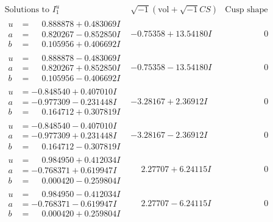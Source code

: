 \documentclass[1p]{elsarticle_modified}
\theoremstyle{definition}
\newcommand{\I}{\sqrt{-1}}
\begin{document}
$$\begin{array}{c|c|c}  
\text{Solutions to }I^u_{1}& \I (\text{vol} + \sqrt{-1}CS) & \text{Cusp shape}\\
 \hline 
\begin{aligned}
u &= \phantom{-}0.888878 + 0.483069 I \\
a &= \phantom{-}0.820267 - 0.852850 I \\
b &= \phantom{-}0.105956 + 0.406692 I\end{aligned}
 & -0.75358 + 13.54180 I & \phantom{-0.000000 } 0 \\ \hline\begin{aligned}
u &= \phantom{-}0.888878 - 0.483069 I \\
a &= \phantom{-}0.820267 + 0.852850 I \\
b &= \phantom{-}0.105956 - 0.406692 I\end{aligned}
 & -0.75358 - 13.54180 I & \phantom{-0.000000 } 0 \\ \hline\begin{aligned}
u &= -0.848540 + 0.407010 I \\
a &= -0.977309 - 0.231448 I \\
b &= \phantom{-}0.164712 + 0.307819 I\end{aligned}
 & -3.28167 + 2.36912 I & \phantom{-0.000000 } 0 \\ \hline\begin{aligned}
u &= -0.848540 - 0.407010 I \\
a &= -0.977309 + 0.231448 I \\
b &= \phantom{-}0.164712 - 0.307819 I\end{aligned}
 & -3.28167 - 2.36912 I & \phantom{-0.000000 } 0 \\ \hline\begin{aligned}
u &= \phantom{-}0.984950 + 0.412034 I \\
a &= -0.768371 + 0.619947 I \\
b &= \phantom{-}0.000420 - 0.259804 I\end{aligned}
 & \phantom{-}2.27707 + 6.24115 I & \phantom{-0.000000 } 0 \\ \hline\begin{aligned}
u &= \phantom{-}0.984950 - 0.412034 I \\
a &= -0.768371 - 0.619947 I \\
b &= \phantom{-}0.000420 + 0.259804 I\end{aligned}
 & \phantom{-}2.27707 - 6.24115 I & \phantom{-0.000000 } 0 \\ \hline\begin{aligned}

\end{aligned}
\end{array}$$
\end{document}
